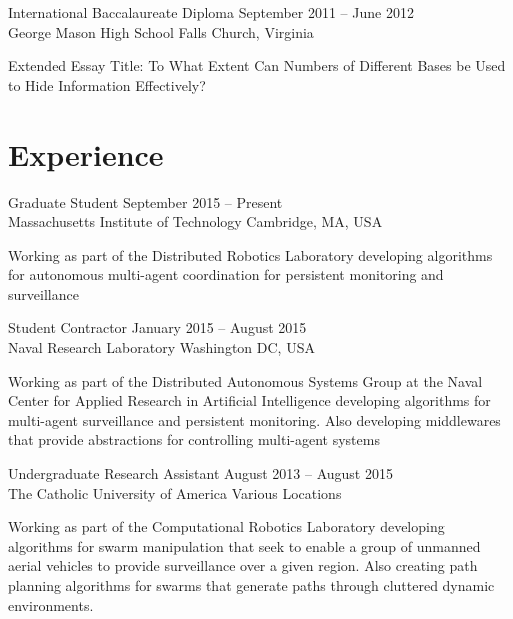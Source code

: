\documentclass[line,margin]{cv}
\begin{document}
\begin{resume}
\begin{adjustwidth}{2.5em}{2.5em}
\end{adjustwidth}

International Baccalaureate Diploma
\hfill September 2011 -- June 2012 \\
George Mason High School \hfill Falls Church, Virginia
\begin{adjustwidth}{2.5em}{2.5em}

    Extended Essay Title: To What Extent Can Numbers of Different Bases be Used
    to Hide Information Effectively?

\end{adjustwidth}

\section{Experience}

Graduate Student
\hfill September 2015 -- Present \\
Massachusetts Institute of Technology \hfill Cambridge, MA, USA

\begin{adjustwidth}{2.5em}{2.5em}

    Working as part of the Distributed Robotics Laboratory developing
    algorithms for autonomous multi-agent coordination for persistent
    monitoring and surveillance

\end{adjustwidth}


Student Contractor
\hfill January 2015 -- August 2015 \\
Naval Research Laboratory \hfill Washington DC, USA

\begin{adjustwidth}{2.5em}{2.5em}

    Working as part of the Distributed Autonomous Systems Group at the Naval
    Center for Applied Research in Artificial Intelligence developing
    algorithms for multi-agent surveillance and persistent monitoring. Also
    developing middlewares that provide abstractions for controlling
    multi-agent systems

\end{adjustwidth}

Undergraduate Research Assistant
\hfill August 2013 -- August 2015 \\
The Catholic University of America \hfill Various Locations

\begin{adjustwidth}{2.5em}{2.5em}

    Working as part of the Computational Robotics Laboratory developing
    algorithms for swarm manipulation that seek to enable a group of unmanned
    aerial vehicles to provide surveillance over a given region. Also creating
    path planning algorithms for swarms that generate paths through cluttered
    dynamic environments.


\end{adjustwidth}
\end{resume}
\end{document}
